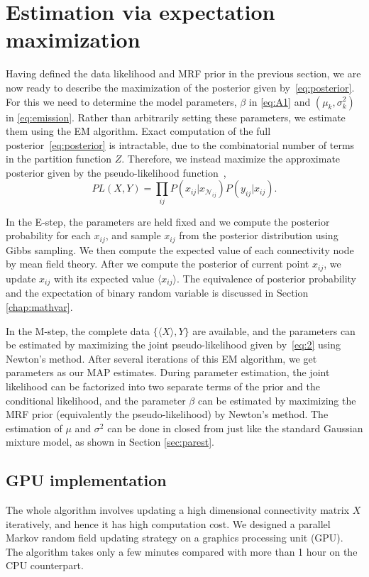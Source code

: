 \section{Estimation via expectation maximization}
\label{sec:algorithm}
Having defined the data likelihood and MRF prior in the previous section, we are
now ready to describe the maximization of the posterior given
by~\eqref{eq:posterior}. For this we need to determine the model parameters,
$\beta$ in \eqref{eq:A1} and $(\mu_k, \sigma_k^2)$ in
\eqref{eq:emission}. Rather than arbitrarily setting these parameters, we
estimate them using the EM algorithm. Exact
computation of the full posterior~\eqref{eq:posterior} is intractable, due to
the combinatorial number of terms in the partition function $Z$. Therefore, we
instead maximize the approximate posterior given by the pseudo-likelihood
function~\cite{li_markov_2009,besag_spatial_1974},
\begin{equation}
PL(X, Y) = \prod_{ij}^{}P (x_{ij}|x_{\mathcal{N}_{ij}}) P(y_{ij}|x_{ij}). \label{eq:2}
\end{equation}

In the E-step, the parameters are held fixed and we compute the posterior
probability for each $x_{ij}$, and sample $x_{ij}$ from the posterior
distribution using Gibbs sampling. We then compute the expected value of each
connectivity node by mean field theory. After we compute the posterior of
current point $x_{ij}$, we update $x_{ij}$ with its expected value $\langle
x_{ij} \rangle$. The equivalence of posterior probability and the expectation of
binary random variable is discussed in Section \ref{chap:mathvar}.

In the M-step, the complete data $\{\langle X\rangle, Y\}$ are available, and the
parameters can be estimated by maximizing the joint pseudo-likelihood given
by~\eqref{eq:2} using Newton's method. After several iterations of this EM
algorithm, we get parameters as our MAP estimates. During parameter estimation,
the joint likelihood can be factorized into two separate terms of the prior and
the conditional likelihood, and the parameter $\beta$ can be estimated by
maximizing the MRF prior (equivalently the pseudo-likelihood) by Newton's
method. The estimation of $\mu$ and $\sigma^2$ can be done in closed from just
like the standard Gaussian mixture model, as shown in Section \ref{sec:parest}.

\subsection{GPU implementation}
 The whole algorithm involves updating a high dimensional connectivity matrix
 $X$ iteratively, and hence it has high computation cost. We designed a parallel
 Markov random field updating strategy on a graphics processing unit (GPU). The
 algorithm takes only a few minutes compared with more than 1 hour on the CPU
 counterpart.


